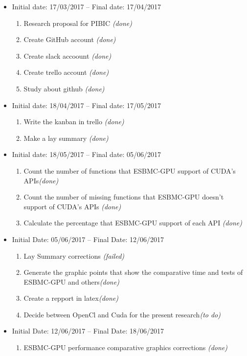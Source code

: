 \documentclass[11pt]{article}
\begin{document}
\begin{itemize}
	\item Initial date: 17/03/2017 -- Final date: 17/04/2017
	\begin{enumerate}
		\item Research proposal for PIBIC {\it (done)}
		\item Create GitHub account {\it (done)}
		\item Create slack accoount {\it (done)}
        \item Create trello account {\it (done)}
        \item Study about github {\it (done)}
	\end{enumerate}

	\item Initial date: 18/04/2017 -- Final date: 17/05/2017
	\begin{enumerate}
		\item Write the kanban in trello {\it (done)}
		\item Make a lay summary {\it (done)}
	\end{enumerate}
	\item Initial date: 18/05/2017 -- Final date: 05/06/2017
    \begin{enumerate}
    	\item Count the number of functions that ESBMC-GPU support of CUDA's APIs{\it (done)}
		\item Count the number of missing functions that ESBMC-GPU doesn't support of CUDA's APIs {\it (done)}
        \item Calculate the percentage that ESBMC-GPU support of each API {\it (done)}
      \end{enumerate}
    \item Initial Date: 05/06/2017 -- Final Date: 12/06/2017
	\begin{enumerate}
		\item Lay Summary corrections {\it (failed)}
		\item Generate the graphic points that show the comparative time and tests of ESBMC-GPU and others{\it (done)}
        \item Create a repport in latex{\it (done)}
        \item Decide between OpenCl and Cuda for the present research{\it (to do)}
	\end{enumerate}
		\item Initial Date: 12/06/2017 -- Final Date: 18/06/2017
			\begin{enumerate}
				\item ESBMC-GPU performance comparative graphics corrections {\it (done)}

\end{enumerate}
\end{itemize}
\end{document}
